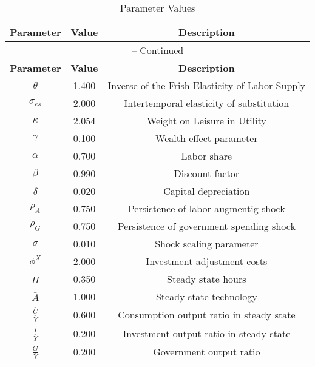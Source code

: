 \begin{center}
\begin{longtable}{ccc}
\caption{Parameter Values}\\%
\toprule%
\multicolumn{1}{c}{\textbf{Parameter}} &
\multicolumn{1}{c}{\textbf{Value}} &
 \multicolumn{1}{c}{\textbf{Description}}\\%
\midrule%
\endfirsthead
\multicolumn{3}{c}{{\tablename} \thetable{} -- Continued}\\%
\midrule%
\multicolumn{1}{c}{\textbf{Parameter}} &
\multicolumn{1}{c}{\textbf{Value}} &
  \multicolumn{1}{c}{\textbf{Description}}\\%
\midrule%
\endhead
${\theta}$ 	 & 	 1.400 	 & 	 Inverse of the Frish Elasticity of Labor Supply\\
${\sigma_{es}}$ 	 & 	 2.000 	 & 	 Intertemporal elasticity of substitution\\
${\kappa}$ 	 & 	 2.054 	 & 	 Weight on Leisure in Utility\\
${\gamma}$ 	 & 	 0.100 	 & 	 Wealth effect parameter\\
${\alpha}$ 	 & 	 0.700 	 & 	 Labor share\\
${\beta}$ 	 & 	 0.990 	 & 	 Discount factor\\
${\delta}$ 	 & 	 0.020 	 & 	 Capital depreciation\\
${\rho_{A}}$ 	 & 	 0.750 	 & 	 Persistence of labor augmentig shock\\
${\rho_{G}}$ 	 & 	 0.750 	 & 	 Persistence of government spending shock\\
${\sigma}$ 	 & 	 0.010 	 & 	 Shock scaling parameter\\
${\phi^X}$ 	 & 	 2.000 	 & 	 Investment adjustment costs\\
$\bar{H}$ 	 & 	 0.350 	 & 	 Steady state hours\\
$\bar{A}$ 	 & 	 1.000 	 & 	 Steady state technology\\
$\frac{\bar{C}}{\bar{Y}}$ 	 & 	 0.600 	 & 	 Consumption output ratio in steady state\\
$\frac{\bar{I}}{\bar{Y}}$ 	 & 	 0.200 	 & 	 Investment output ratio in steady state\\
$\frac{\bar{G}}{\bar{Y}}$ 	 & 	 0.200 	 & 	 Government output ratio\\
\bottomrule%
\end{longtable}
\end{center}
